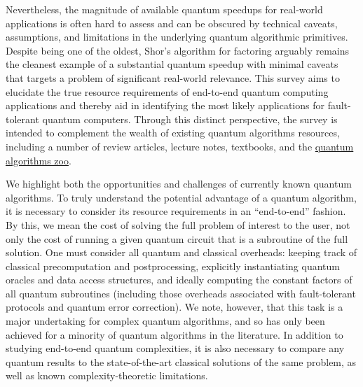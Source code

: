 \documentclass[a4paper,11pt,notitlepage]{report}
\begin{document}
Nevertheless, the magnitude of available quantum speedups for real-world applications is often hard to assess and can be obscured by technical caveats, assumptions, and limitations in the underlying quantum algorithmic primitives. Despite being one of the oldest, Shor’s algorithm for factoring arguably remains the cleanest example of a substantial quantum speedup with minimal caveats that targets a problem of significant real-world relevance.
This survey aims to elucidate the true resource requirements of end-to-end quantum computing applications and thereby aid in identifying the most likely applications for fault-tolerant quantum computers. Through this distinct perspective, the survey is intended to complement the wealth of existing quantum algorithms resources, including a number of review articles, lecture notes, textbooks, and the \href{https://quantumalgorithmzoo.org/}{quantum algorithms zoo}. 

We highlight both the opportunities and challenges of currently known quantum algorithms.
To truly understand the potential advantage of a quantum algorithm, it is necessary to consider its resource requirements in an ``end-to-end'' fashion. By this, we mean the cost of solving the full problem of interest to the user, not only the cost of running a given quantum circuit that is a subroutine of the full solution. One must consider all quantum and classical overheads: keeping track of classical precomputation and postprocessing, explicitly instantiating quantum oracles and data access structures, and ideally computing the constant factors of all quantum subroutines (including those overheads associated with fault-tolerant protocols and quantum error correction). We note, however, that this task is a major undertaking for complex quantum algorithms, and so has only been achieved for a minority of quantum algorithms in the literature. In addition to studying end-to-end quantum complexities, it is also necessary to compare any quantum results to the state-of-the-art classical solutions of the same problem, as well as known complexity-theoretic limitations.
\end{document}
